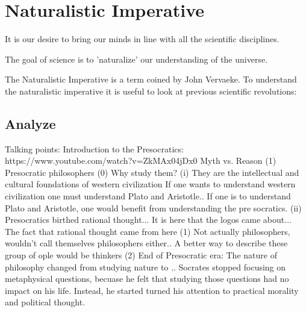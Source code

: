 \documentclass[twoside]{article}
\begin{document}
%
%
\section{Naturalistic Imperative}
It is our desire to bring our minds in line with all the scientific
disciplines.

The goal of science is to 'naturalize' our understanding of the universe.

The Naturalistic Imperative is a term coined by John Vervaeke. To understand
the naturalistic imperative it is useful to look at previous scientific revolutions:

\subsection{Analyze}
Talking points:
Introduction to the Presocratics: https://www.youtube.com/watch?v=ZkMAx04jDx0
Myth vs. Reason
(1) Presocratic philosophers
  (0) Why study them?
    (i) They are the intellectual and cultural foundations of western civilization
        If one wants to understand western civilization one must understand Plato
        and Aristotle.. If one is to understand Plato and Aristotle, one would
        benefit from understanding the pre socratics.
    (ii) Presocratics birthed rational thought... It is here that the logos
        came about... The fact that rational thought came from here
  (1) Not actually philosophers, wouldn't call themselves philosophers either..
      A better way to describe these group of ople would be thinkers
  (2) End of Presocratic era: The nature of philosophy changed from studying
  nature to .. Socrates stopped focusing on metaphysical questions, becuase
  he felt that studying those questions had no impact on his life. Instead, he started
  turned his attention to practical morality and political thought.
\end{document}
